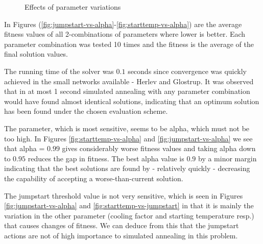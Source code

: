 \begin{figure}[htbp]
\caption{Effects of parameter variations}
\end{figure}

In Figures (\ref{fig:jumpstart-vs-alpha}-\ref{fig:starttemp-vs-alpha}) are the average fitness values of all 2-combinations of parameters where lower is better. Each parameter combination was tested 10 times and the fitness is the average of the final solution values. 

The running time of the solver was $0.1$ seconds since convergence was quickly achieved in the small networks available - Herlev and Glostrup. It was observed that in at most 1 second simulated annealing with any parameter combination would have found almost identical solutions, indicating that an optimum solution has been found under the chosen evaluation scheme.

The parameter, which is most sensitive, seems to be alpha, which must not be too high. In Figures \ref{fig:starttemp-vs-alpha} and \ref{fig:jumpstart-vs-alpha} we see that alpha = $0.99$ gives considerably worse fitness values and taking alpha down to $0.95$ reduces the gap in fitness. The best alpha value is $0.9$ by a minor margin indicating that the best solutions are found by - relatively quickly - decreasing the capability of accepting a worse-than-current solution.

The jumpstart threshold value is not very sensitive, which is seen in Figures \ref{fig:jumpstart-vs-alpha} and \ref{fig:starttemp-vs-jumpstart} in that it is mainly the variation in the other parameter (cooling factor and starting temperature resp.) that causes changes of fitness. We can deduce from this that the jumpstart actions are not of high importance to simulated annealing in this problem.

